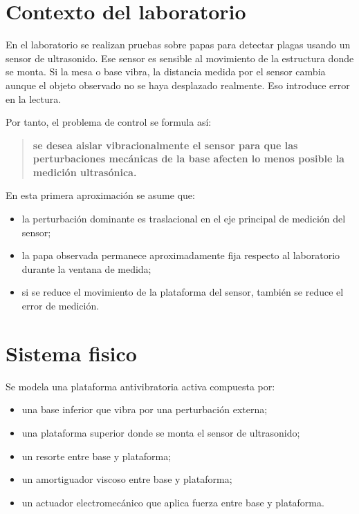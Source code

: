 \documentclass[11pt]{article}
\begin{document}
\section{Contexto del laboratorio}

En el laboratorio se realizan pruebas sobre papas para detectar plagas usando un sensor de ultrasonido. Ese sensor es sensible al movimiento de la estructura donde se monta. Si la mesa o base vibra, la distancia medida por el sensor cambia aunque el objeto observado no se haya desplazado realmente. Eso introduce error en la lectura.

Por tanto, el problema de control se formula as\'i:

\begin{quote}
\textbf{se desea aislar vibracionalmente el sensor para que las perturbaciones mec\'anicas de la base afecten lo menos posible la medici\'on ultras\'onica.}
\end{quote}

En esta primera aproximaci\'on se asume que:

\begin{itemize}[leftmargin=1.2cm]
\item la perturbaci\'on dominante es traslacional en el eje principal de medici\'on del sensor;
\item la papa observada permanece aproximadamente fija respecto al laboratorio durante la ventana de medida;
\item si se reduce el movimiento de la plataforma del sensor, tambi\'en se reduce el error de medici\'on.
\end{itemize}

\section{Sistema fisico}

Se modela una plataforma antivibratoria activa compuesta por:

\begin{itemize}[leftmargin=1.2cm]
\item una base inferior que vibra por una perturbaci\'on externa;
\item una plataforma superior donde se monta el sensor de ultrasonido;
\item un resorte entre base y plataforma;
\item un amortiguador viscoso entre base y plataforma;
\item un actuador electromec\'anico que aplica fuerza entre base y plataforma.
\end{itemize}
\end{document}
